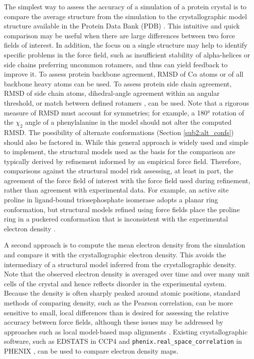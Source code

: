 \documentclass[9pt,review,pubversion]{livecoms}
\begin{document}
The simplest way to assess the accuracy of a simulation of a protein crystal is to compare the average structure from the simulation to the crystallographic model structure available in the Protein Data Bank (PDB) \cite{bernstein_protein_1977,berman_protein_2000,rose_rcsb_2015}.
This intuitive and quick comparison may be useful when there are large differences between two force fields of interest.
In addition, the focus on a single structure may help to identify specific problems in the force field, such as insufficient stability of alpha-helices or side chains preferring uncommon rotamers, and thus can yield feedback to improve it.
To assess protein backbone agreement, RMSD of C$\alpha$ atoms or of all backbone heavy atoms can be used.
To assess protein side chain agreement, RMSD of side chain atoms, dihedral-angle agreement within an angular threshold, or match between defined rotamers \cite{dunbrack_backbone-dependent_1993,lovell_penultimate_2000}, can be used.
Note that a rigorous measure of RMSD must account for symmetries; for example, a \ang{180} rotation of the $\chi_2$ angle of a phenylalanine in the model should not alter the computed RMSD.
The possibility of alternate conformations (Section \ref{sub2:alt_confs}) should also be factored in.
While this general approach is widely used and simple to implement, the structural models used as the basis for the comparison are typically derived by refinement informed by an empirical force field.
Therefore, comparisons against the structural model risk assessing, at least in part, the agreement of the force field of interest with the force field used during refinement, rather than agreement with experimental data.
For example, an active site proline in ligand-bound triosephosphate isomerase adopts a planar ring conformation, but structural models refined using force fields place the proline ring in a puckered conformation that is inconsistent with the experimental electron density \cite{donnini_planar_2006}.

A second approach is to compute the mean electron density from the simulation \cite{grosse-kunstleve_computational_2002,wall_methods_2009,winn_overview_2011,case_amber_2022} and compare it with the crystallographic electron density.
This avoids the intermediary of a structural model inferred from the crystallographic density.
Note that the observed electron density is averaged over time and over many unit cells of the crystal and hence reflects disorder in the experimental system.
Because the density is often sharply peaked around atomic positions, standard methods of comparing density, such as the Pearson correlation, can be more sensitive to small, local differences than is desired for assessing the relative accuracy between force fields, although these issues may be addressed by approaches such as local model-based map alignments \cite{pearce_multi-crystal_2017}.
Existing crystallographic software, such as EDSTATS in CCP4 \cite{winn_overview_2011} and \verb|phenix.real_space_correlation| in PHENIX \cite{liebschner_macromolecular_2019}, can be used to compare electron density maps.
\end{document}
